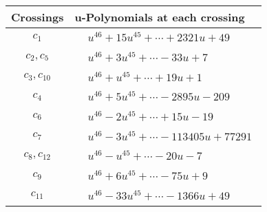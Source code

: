 \documentclass[1p]{elsarticle_modified}
\theoremstyle{definition}
\begin{document}
\begin{tabular}{m{50pt}|m{274pt}}
Crossings & \hspace{64pt}u-Polynomials at each crossing \\
\hline $$\begin{aligned}c_{1}\end{aligned}$$&$\begin{aligned}
&u^{46}+15 u^{45}+\cdots+2321 u+49
\end{aligned}$\\
\hline $$\begin{aligned}c_{2},c_{5}\end{aligned}$$&$\begin{aligned}
&u^{46}+3 u^{45}+\cdots-33 u+7
\end{aligned}$\\
\hline $$\begin{aligned}c_{3},c_{10}\end{aligned}$$&$\begin{aligned}
&u^{46}+u^{45}+\cdots+19 u+1
\end{aligned}$\\
\hline $$\begin{aligned}c_{4}\end{aligned}$$&$\begin{aligned}
&u^{46}+5 u^{45}+\cdots-2895 u-209
\end{aligned}$\\
\hline $$\begin{aligned}c_{6}\end{aligned}$$&$\begin{aligned}
&u^{46}-2 u^{45}+\cdots+15 u-19
\end{aligned}$\\
\hline $$\begin{aligned}c_{7}\end{aligned}$$&$\begin{aligned}
&u^{46}-3 u^{45}+\cdots-113405 u+77291
\end{aligned}$\\
\hline $$\begin{aligned}c_{8},c_{12}\end{aligned}$$&$\begin{aligned}
&u^{46}- u^{45}+\cdots-20 u-7
\end{aligned}$\\
\hline $$\begin{aligned}c_{9}\end{aligned}$$&$\begin{aligned}
&u^{46}+6 u^{45}+\cdots-75 u+9
\end{aligned}$\\
\hline $$\begin{aligned}c_{11}\end{aligned}$$&$\begin{aligned}
&u^{46}-33 u^{45}+\cdots-1366 u+49
\end{aligned}$\\
\hline
\end{tabular}\\~\\
\end{document}
